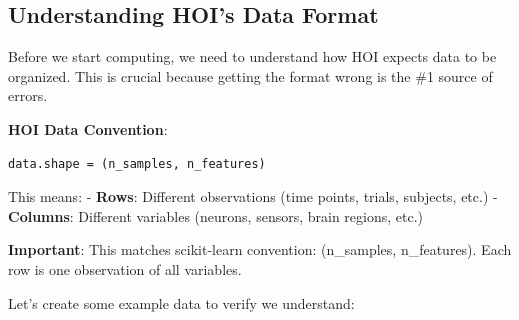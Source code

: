 \documentclass[
  11pt,
  letterpaper,
  oneside,
  openany]{book}
\begin{document}
\subsection{Understanding HOI's Data
Format}\label{understanding-hois-data-format}

Before we start computing, we need to understand how HOI expects data to
be organized. This is crucial because getting the format wrong is the
\#1 source of errors.

\textbf{HOI Data Convention}:

\begin{verbatim}
data.shape = (n_samples, n_features)
\end{verbatim}

This means: - \textbf{Rows}: Different observations (time points,
trials, subjects, etc.) - \textbf{Columns}: Different variables
(neurons, sensors, brain regions, etc.)

\textbf{Important}: This matches scikit-learn convention: (n\_samples,
n\_features). Each row is one observation of all variables.

Let's create some example data to verify we understand:
\end{document}
